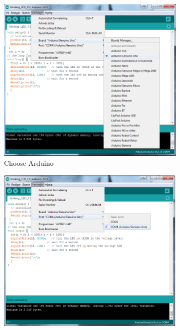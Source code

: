 \begin{figure}
\begin{subfigure}{0.47\linewidth}
\centering
\includegraphics[width=\linewidth]{Figures/ChooseArduino.png}
\caption{Choose Arduino}
\label{fig:choose_arduino}
\end{subfigure}\hfill
\begin{subfigure}{0.47\linewidth}
\centering
\includegraphics[width=\linewidth]{Figures/ChoosePort.png}

\end{subfigure}
\end{figure}
